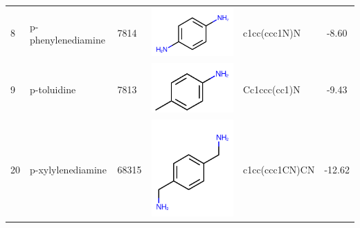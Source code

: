 \documentclass[aps,pre,twocolumn,nofootinbib,superscriptaddress,10pt, final,tightenlines]{revtex4-1}
\begin{document}
\begin{table}
\begin{tabular}{lllp{2cm}>{\ttfamily}lS[table-format=-1.2, table-figures-uncertainty=1]}
8   & p-phenylenediamine       & 7814      & \parbox[c]{1em}{\includegraphics[scale=0.2]{figures/7814.pdf}}  & c1cc(ccc1N)N                      & -8.60                                             \\
9   & p-toluidine              & 7813      & \parbox[c]{1em}{\includegraphics[scale=0.2]{figures/7813.pdf}}  & Cc1ccc(cc1)N                      & -9.43                                             \\
20  & p-xylylenediamine        & 68315     & \parbox[c]{1em}{\includegraphics[scale=0.2]{figures/68315.pdf}} & c1cc(ccc1CN)CN         & -12.62                                            \\

\end{tabular}
\end{table}
\end{document}
